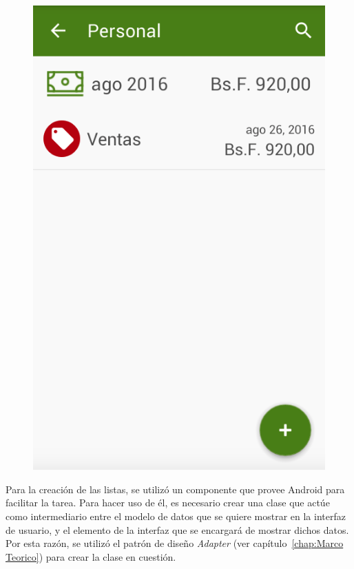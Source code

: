 \begin{figure}[ht]
\begin{minipage}{.5\textwidth}
  \includegraphics[scale=0.4,type=png,ext=.png,read=.png]{imagenes/incomes_list}
  \captionsetup{justification=centering}
  \label{fig:interfazListarIncomes}
\end{minipage}
\end{figure}

Para la creación de las listas, se utilizó un componente que provee Android para facilitar la tarea. Para hacer uso de él, es necesario crear una clase que actúe como intermediario entre el modelo de datos que se quiere mostrar en la interfaz de usuario, y el elemento de la interfaz que se encargará de mostrar dichos datos. Por esta razón, se utilizó el patrón de diseño \textit{Adapter} (ver capítulo~\ref{chap:Marco Teorico}) para crear la clase en cuestión.


